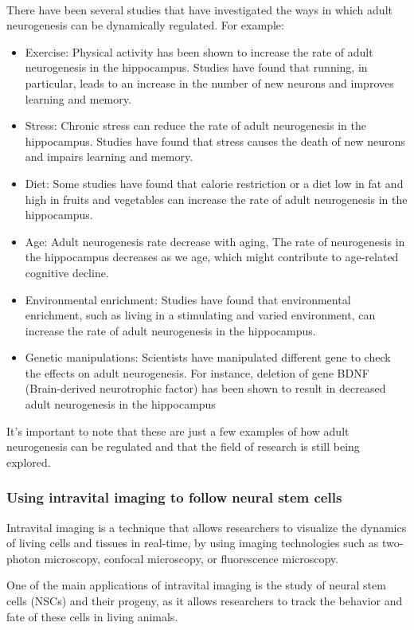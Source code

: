 \begin{itemize}
\begin{itemize}
\\There have been several studies that have investigated the ways in which adult neurogenesis can be dynamically regulated. For example:
\begin{itemize}
    \item Exercise: Physical activity has been shown to increase the rate of adult neurogenesis in the hippocampus. Studies have found that running, in particular, leads to an increase in the number of new neurons and improves learning and memory.
\item Stress: Chronic stress can reduce the rate of adult neurogenesis in the hippocampus. Studies have found that stress causes the death of new neurons and impairs learning and memory.
\item Diet: Some studies have found that calorie restriction or a diet low in fat and high in fruits and vegetables can increase the rate of adult neurogenesis in the hippocampus.
\item Age: Adult neurogenesis rate decrease with aging, The rate of neurogenesis in the hippocampus decreases as we age, which might contribute to age-related cognitive decline.
\item Environmental enrichment: Studies have found that environmental enrichment, such as living in a stimulating and varied environment, can increase the rate of adult neurogenesis in the hippocampus.
\item Genetic manipulations: Scientists have manipulated different gene to check the effects on adult neurogenesis. For instance, deletion of gene BDNF (Brain-derived neurotrophic factor) has been shown to result in decreased adult neurogenesis in the hippocampus
\end{itemize}

It's important to note that these are just a few examples of how adult neurogenesis can be regulated and that the field of research is still being explored.
\subsubsection{Using intravital imaging to follow neural stem cells}
Intravital imaging is a technique that allows researchers to visualize the dynamics of living cells and tissues in real-time, by using imaging technologies such as two-photon microscopy, confocal microscopy, or fluorescence microscopy.

One of the main applications of intravital imaging is the study of neural stem cells (NSCs) and their progeny, as it allows researchers to track the behavior and fate of these cells in living animals.


\end{itemize}
\end{itemize}
